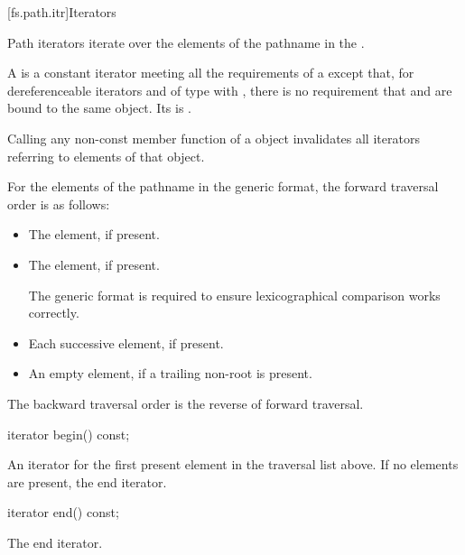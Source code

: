 [fs.path.itr]{Iterators}

%
\pnum
Path iterators iterate over the elements of the pathname
in the .

\pnum
A  is a constant iterator meeting all the
requirements of a 
except that,
for dereferenceable iterators  and 
of type 
with ,
there is no requirement that  and 
are bound to the same object.
Its  is .

\pnum
Calling any non-const member function of a  object
invalidates all iterators referring to elements of that object.

\pnum
For the elements of the pathname in the generic format,
the forward traversal order is as follows:
\begin{itemize}
\item The  element, if present.
\item The  element, if present.
\begin{note}
The generic format is required to ensure lexicographical
comparison works correctly.
\end{note}
\item Each successive  element, if present.
\item An empty element, if a trailing non-root 
is present.
\end{itemize}

\pnum
The backward traversal order is the reverse of forward traversal.

%
\begin{itemdecl}
iterator begin() const;
\end{itemdecl}

\begin{itemdescr}
\pnum
\returns
An iterator for the first present element in the traversal
list above. If no elements are present, the end iterator.
\end{itemdescr}

%
\begin{itemdecl}
iterator end() const;
\end{itemdecl}

\begin{itemdescr}
\pnum
\returns
The end iterator.
\end{itemdescr}

